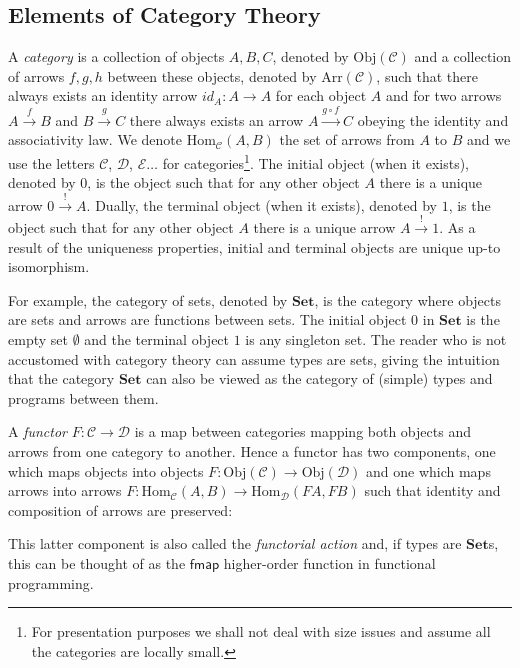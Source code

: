 \documentclass[a4paper,UKenglish,cleveref, autoref, thm-restate]{lipics-v2021}
\newcommand{\operator}[1]{\textsf{#1}}
\newcommand{\CatC}{\mathcal{C}}
\newcommand{\CatD}{\mathcal{D}}
\newcommand{\CatE}{\mathcal{E}}
\newcommand{\Set}{\mathbf{Set}}
\newcommand{\Hom}{\text{Hom}}
\newcommand{\Obj}{\text{Obj}}
\newcommand{\Arr}{\text{Arr}}
\begin{document}
\subsection{Elements of Category Theory}
A \emph{category} is a collection of objects $A, B, C$, denoted by $\Obj(\CatC)$
and a collection of arrows $f, g, h$ between these objects, denoted by $\Arr
(\CatC)$, such that there always exists an identity arrow $id_{A} : A \to A$ for
each object $A$ and for two arrows $A \xrightarrow{f} B$ and $B \xrightarrow{g}
C$ there always exists an arrow $A \xrightarrow{g\circ f} C$ obeying the identity and
associativity law. We denote $\Hom_{\CatC} (A, B)$ the set of arrows from $A$ to
$B$ and we use the letters $\CatC$, $\CatD$, $\CatE\dots$ for
categories\footnote[1]{For presentation purposes we shall not deal with size
  issues and assume all the categories are locally small.}. The initial object (when it exists), denoted by $0$,
is the object such that for any other object $A$
there is a unique arrow $0 \xrightarrow{!} A$.  Dually, the terminal object (when it exists),
denoted by $1$, is the object such that for any other object $A$ there is a
unique arrow $A \xrightarrow{!} 1$. As a result of the uniqueness properties, initial and terminal objects are unique up-to
isomorphism.

For example, the category of sets, denoted by $\Set$, is the category where
objects are sets and arrows are functions between sets. The initial object $0$
in $\Set$ is the empty set $\emptyset$ and the terminal object $1$ is any
singleton set. The reader who is not accustomed with category theory can assume
types are sets, giving the intuition that the category $\Set$ can also be viewed
as the category of (simple) types and programs between them.

A \emph{functor} $F : \CatC \to \CatD$ is a map between categories mapping both
objects and arrows from one category to another. Hence a functor has two
components, one which maps objects into objects
$F : \Obj(\CatC) \to \Obj(\CatD)$ and one which maps arrows into arrows
$F : \Hom_{\CatC}(A, B) \to \Hom_{\CatD} (FA,FB)$ such that identity and
composition of arrows are preserved:
This latter component is also called the \emph{functorial action} and, if types
are $\Set$s, this can be thought of as the $\operator{fmap}$ higher-order
function in functional programming.
\end{document}

